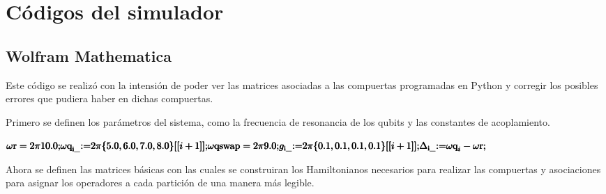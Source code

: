 \chapter{Códigos del simulador}

\section{Wolfram Mathematica}

Este código se realizó con la intensión de poder ver las matrices asociadas a las compuertas programadas en Python y corregir los posibles errores que pudiera haber en dichas compuertas.

Primero se definen los parámetros del sistema, como la frecuencia de resonancia de los qubits y las constantes de acoplamiento.

\begin{doublespace}
\noindent\(\pmb{\text{$\omega $r}=2\pi  10.0;}\\
\pmb{\text{$\omega $q}_{\text{i$\_$}}\text{:=}2\pi \{5.0,6.0,7.0,8.0\}[[i+1]];}\\
\pmb{\text{$\omega $qswap}=2\pi  9.0;}\\
\pmb{g_{\text{i$\_$}}\text{:=}2\pi \{0.1,0.1,0.1,0.1\}[[i+1]];}\\
\pmb{\Delta _{\text{i$\_$}}\text{:=}\text{$\omega $q}_i-\text{$\omega $r};}\)
\end{doublespace}

Ahora se definen las matrices básicas con las cuales se construiran los Hamiltonianos necesarios para realizar las compuertas y asociaciones para asignar los operadores a cada partición de una manera más legible.

